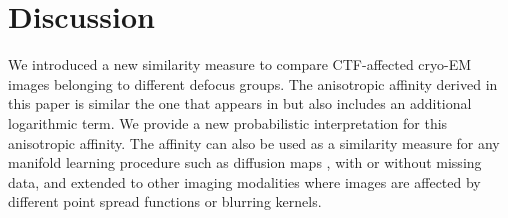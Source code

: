 \documentclass{article}
\begin{document}
\section{Discussion}
We introduced a new similarity measure to compare CTF-affected cryo-EM images belonging to different defocus groups.  The anisotropic affinity derived in this paper is similar the one that appears in \cite{nlica, intgeom} but also includes an additional logarithmic term. We provide a new probabilistic interpretation for this anisotropic affinity. The affinity can also be used as a similarity measure for any manifold learning procedure \cite{intgeom, nlica} such as diffusion maps \cite{vdm, difmap}, with or without missing data, and extended to other imaging modalities where images are affected by different point spread functions or blurring kernels.


\end{document}
